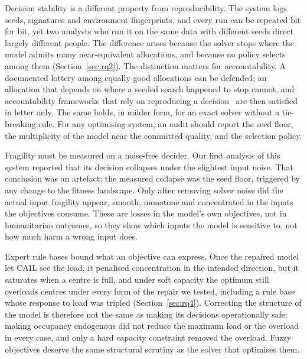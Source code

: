 \documentclass[systems,article,submit,moreauthors,pdftex]{Definitions/mdpi}
\begin{document}
Decision stability is a different property from reproducibility. The system logs seeds,
signatures and environment fingerprints, and every run can be repeated bit for bit, yet two
analysts who run it on the same data with different seeds direct largely different people. The
difference arises because the solver stops where the model admits many near-equivalent
allocations, and because no policy selects among them (Section~\ref{sec:rq2}). The distinction matters for
accountability. A documented lottery among equally good allocations can be defended; an
allocation that depends on where a seeded search happened to stop cannot, and accountability
frameworks that rely on reproducing a decision~\cite{kroll2017accountable} are then satisfied in
letter only. The same holds, in milder form, for an exact solver without a tie-breaking rule. For
any optimising system, an audit should report the seed floor, the multiplicity of the model near
the committed quality, and the selection policy.

Fragility must be measured on a noise-free decider. Our first analysis of this system reported
that its decision collapses under the slightest input noise. That conclusion was an artefact: the
measured collapse was the seed floor, triggered by any change to the fitness landscape. Only
after removing solver noise did the actual input fragility appear, smooth, monotone and
concentrated in the inputs the objectives consume. These are losses in the model's own
objectives, not in humanitarian outcomes, so they show which inputs the model is sensitive to,
not how much harm a wrong input does.

Expert rule bases bound what an objective can express. Once the repaired model let CAIL see the
load, it penalised concentration in the intended direction, but it saturates when a centre is
full, and under soft capacity the optimum still overloads centres under every form of the repair
we tested, including a rule base whose response to load was tripled (Section~\ref{sec:rq4}).
Correcting the structure of the model is therefore not the same as making its decisions
operationally safe: making occupancy endogenous did not reduce the maximum load or the overload
in every case, and only a hard capacity constraint removed the overload. Fuzzy objectives deserve
the same structural scrutiny as the solver that optimises them.
\end{document}
